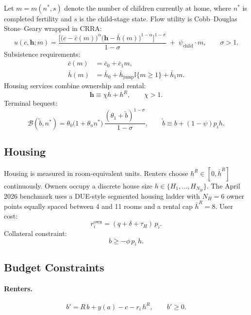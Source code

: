 \documentclass[11pt]{article}
\newcommand{\ind}{\mathbb{I}}
\begin{document}
Let $m=m(n^*,s)$ denote the number of children currently at home, where $n^*$ is completed fertility and $s$ is the child-stage state. Flow utility is Cobb--Douglas Stone--Geary wrapped in CRRA:
\begin{equation}\label{eq:flow_utility}
u(c,\mathbf h;m)
= \frac{\Big[\big(c-\bar c(m)\big)^\alpha \big(\mathbf h-\bar h(m)\big)^{1-\alpha}\Big]^{1-\sigma}}{1-\sigma}
\;+\; \psi_{\text{child}} \cdot m,
\qquad \sigma > 1.
\end{equation}
Subsistence requirements:
\begin{align}
\bar c(m) &= \bar c_0 + \bar c_1 m, \label{eq:cbar}\\
\bar h(m) &= \bar h_0 + \bar h_{\mathrm{jump}} \ind\{m \ge 1\} + \bar h_1 m. \label{eq:hbar}
\end{align}
Housing services combine ownership and rental:
\begin{equation}
\mathbf h \equiv \chi h + h^R, \qquad \chi > 1.
\end{equation}
Terminal bequest:
\begin{equation}\label{eq:bequest}
\mathcal B(\widetilde b,n^*) = \theta_0 \big(1+\theta_n n^*\big)\,\frac{(\theta_1+\widetilde b)^{1-\sigma}}{1-\sigma},
\qquad
\widetilde b \equiv b + (1-\psi)p_i h.
\end{equation}

\subsection{Housing}

Housing is measured in room-equivalent units. Renters choose $h^R \in [0, \bar h^R]$ continuously. Owners occupy a discrete house size $h \in \{H_1,\ldots,H_{N_H}\}$. The April 2026 benchmark uses a DUE-style segmented housing ladder with $N_H = 6$ owner points equally spaced between 4 and 11 rooms and a rental cap $\bar h^R = 8$. User cost:
\begin{equation}
r_i^{\mathrm{own}} = (q+\delta+\tau_H)\,p_i.
\end{equation}
Collateral constraint:
\begin{equation}
b \geq -\phi\, p_i\, h.
\end{equation}

\subsection{Budget Constraints}

\paragraph{Renters.}
\begin{equation}
b' = R\,b + y(a) - c - r_i\,h^R, \qquad b' \geq 0.
\end{equation}
\end{document}
